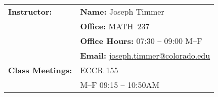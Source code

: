 \documentclass[11pt]{article}
\begin{document}
\begin{longtable}{lp{5.2in}}
%
\textbf{Instructor:}
   & {\bf Name:}     \hspace{8.00ex} Joseph Timmer
   \\
   & {\bf Office:}    \hspace{8.25ex} MATH~237
   \\
   & {\bf Office Hours:} \hspace{.20ex} 07:30 -- 09:00 M--F
   \\
   & {\bf Email:}    \hspace{8.00ex} \url{joseph.timmer@colorado.edu}
   \\[6pt]
%

\textbf{Class Meetings:}
   &  ECCR 155
   \\
   &  M--F 09:15 -- 10:50\/AM 
  \\[6pt]


\end{longtable}
\end{document}
